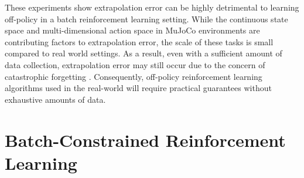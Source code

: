 \documentclass{article}
\begin{document}

These experiments show extrapolation error can be highly detrimental to learning off-policy in a batch reinforcement learning setting. While the continuous state space and multi-dimensional action space in MuJoCo environments are contributing factors to extrapolation error, the scale of these tasks is small compared to real world settings. As a result, even with a sufficient amount of data collection, extrapolation error may still occur due to the concern of catastrophic forgetting \cite{mccloskey1989catastrophic, goodfellow2013empirical}. Consequently, off-policy reinforcement learning algorithms used in the real-world will require practical guarantees without exhaustive amounts of data. 


\section{Batch-Constrained Reinforcement Learning} \label{sec:DRL}
\end{document}
